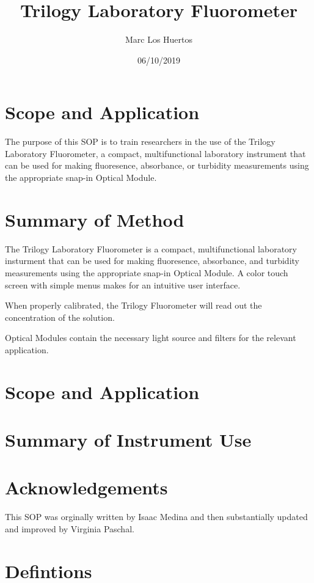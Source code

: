 \documentclass[12pt]{../SOP4_alpha}\usepackage[]{graphicx}\usepackage[]{color}
\title{Trilogy Laboratory Fluorometer}
\date{06/10/2019}
\author{Marc Los Huertos}
\begin{document}
\maketitle

\section{Scope and Application}

\NP The purpose of this SOP is to train researchers in the use of the Trilogy Laboratory Fluorometer, a compact, multifunctional laboratory instrument that can be used for making fluoresence, absorbance, or turbidity measurements using the appropriate snap-in Optical Module. 

\section{Summary of Method}

\NP The Trilogy Laboratory Fluorometer is a compact, multifunctional laboratory insturment that can be used for making fluoresence, absorbance, and turbidity measurements using the appropriate snap-in Optical Module. A color touch screen with simple menus makes for an intuitive user interface. 

\NP When properly calibrated, the Trilogy Fluorometer will read out the concentration of the solution. 

\NP Optical Modules contain the necessary light source and filters for the relevant application. 

\tableofcontents

\newpage

\section{Scope and Application}

\section{Summary of Instrument Use}


\section{Acknowledgements}

This SOP was orginally written by Isaac Medina and then substantially updated and improved by Virginia Paschal. 

\section{Defintions}
\end{document}
